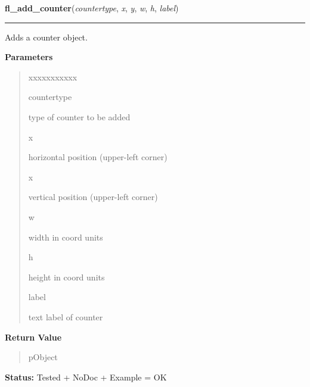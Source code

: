     \label{xformslib:library:fl_add_counter}

    \vspace{0.5ex}

\hspace{.8\funcindent}\begin{boxedminipage}{\funcwidth}

    \raggedright \textbf{fl\_add\_counter}(\textit{countertype}, \textit{x}, \textit{y}, \textit{w}, \textit{h}, \textit{label})

    \vspace{-1.5ex}

    \rule{\textwidth}{0.5\fboxrule}
\setlength{\parskip}{2ex}
    Adds a counter object.

\setlength{\parskip}{1ex}
      \textbf{Parameters}
      \vspace{-1ex}

      \begin{quote}
        \begin{Ventry}{xxxxxxxxxxx}

          \item[countertype]

          type of counter to be added

          \item[x]

          horizontal position (upper-left corner)

          \item[x]

          vertical position (upper-left corner)

          \item[w]

          width in coord units

          \item[h]

          height in coord units

          \item[label]

          text label of counter

        \end{Ventry}

      \end{quote}

      \textbf{Return Value}
    \vspace{-1ex}

      \begin{quote}
      pObject

      \end{quote}

\textbf{Status:} Tested + NoDoc + Example = OK



    \end{boxedminipage}


